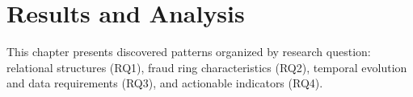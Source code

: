 \chapter{Results and Analysis}
\label{ch:results}

This chapter presents discovered patterns organized by research question: relational structures (RQ1), fraud ring characteristics (RQ2), temporal evolution and data requirements (RQ3), and actionable indicators (RQ4).











